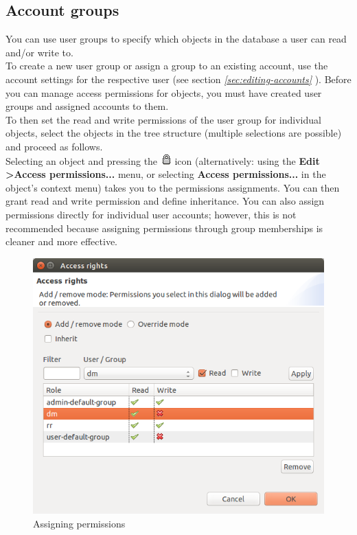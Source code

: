 \documentclass[a4paper,10pt]{book}
\begin{document}
\subsection{Account groups} \label{Account groups}
You can use user groups to specify which objects in the database a user can read and/or write to.
\newline\\
To create a new user group or assign a group to an existing account, use the account settings for the respective user (see
section {\em \ref{sec:editing-accounts} }).
Before you can manage access permissions for objects, you must have created user groups and assigned accounts to them.
\newline\\
To then set the read and write permissions of the user group for individual objects, select the objects in the tree structure
(multiple selections are possible) and proceed as follows.
\newline\\
Selecting an object and pressing the \includegraphics[height=2ex]{Icon/Zugriffsrechte.png} icon (alternatively: using the
\textbf{Edit \textgreater Access permissions...} menu, or selecting \textbf{Access permissions...} in the object's
context menu) takes you to the permissions assignments. You can then grant read and write permission and define
inheritance. You can also assign permissions directly for individual user accounts; however, this is not recommended
because assigning permissions through group memberships is cleaner and more effective.
\newline
\begin{figure}[htb!]
  \centering
  \includegraphics[scale=.54]{Screenshot/zugriffsrechte-dialog_en.png}
  \caption{\label{Assigning permissions} Assigning permissions}
\end{figure}
\end{document}
